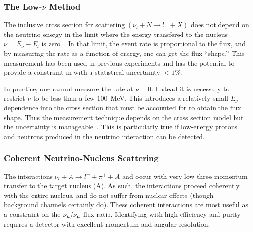 \subsubsection{The Low-$\nu$ Method}
\label{ssec:intro-low-nu}
The inclusive cross section for  scattering $(\nu_l+N\rightarrow l^-+X)$ does not depend on the neutrino energy in the limit where the energy transfered to the nucleus $\nu = E_\nu-E_{l} $ is zero~\cite{bib:original_lownu}.  In that limit, the event rate is proportional to the flux, and by measuring the rate as a function of energy, one can get the flux ``shape.'' This measurement has been used in previous experiments and has the potential to provide a constraint in \dune with a statistical uncertainty $<1\%$.

In practice, one cannot measure the rate at $\nu=0$. Instead it is necessary to restrict $\nu$ to be less than a few \SI{100}{MeV}.  This introduces a relatively small $E_\nu$ dependence into the cross section that must be accounted for to obtain the flux shape. Thus the  measurement technique depends on the cross section model but the uncertainty is manageable~\cite{bib:bodek_lownu}. This is particularly true if low-energy protons and neutrons produced in the neutrino interaction can be detected. 

\subsubsection{Coherent Neutrino-Nucleus Scattering}
The interactions $\nu_l + A \rightarrow l^- + \pi^+ + A$ and 
occur with very low three momentum transfer to the target nucleus (A).  As such, the interactions proceed coherently with the entire nucleus, and do not suffer from nuclear effects (though background channels certainly do). These coherent interactions are most useful as a constraint on the $\bar\nu_\mu/\nu_\mu$ flux ratio. Identifying with high efficiency and purity requires a detector with excellent momentum and angular resolution.

